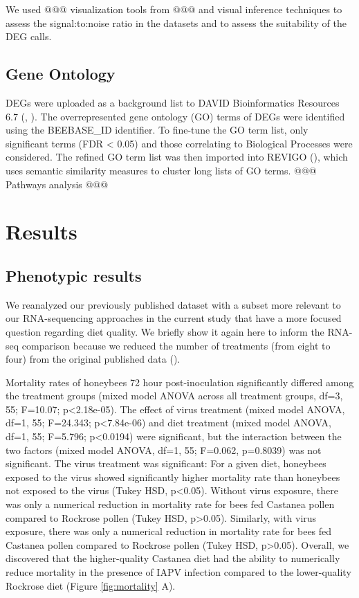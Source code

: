 \documentclass[11pt,a4paper,oldfontcommands,openany]{memoir}
\numberwithin{equation}{section} %
\begin{document}
We used @@@ visualization tools from @@@ and visual inference techniques to assess the signal:to:noise ratio in the datasets and to assess the suitability of the DEG calls. 

\subsection{Gene Ontology}

DEGs were uploaded as a background list to DAVID Bioinformatics Resources 6.7 (\citealt{davidBio}, \citealt{davidBio2}). The overrepresented gene ontology (GO) terms of DEGs were identified using the BEEBASE\_ID identifier. To fine-tune the GO term list, only significant terms (FDR < 0.05) and those correlating to Biological Processes were considered. The refined GO term list was then imported into REVIGO (\citealt{revigo}), which uses semantic similarity measures to cluster long lists of GO terms. @@@ Pathways analysis @@@

\section{Results}

\subsection{Phenotypic results}

We reanalyzed our previously published dataset with a subset more relevant to our RNA-sequencing approaches in the current study that have a more focused question regarding diet quality. We briefly show it again here to inform the RNA-seq comparison because we reduced the number of treatments (from eight to four) from the original published data (\citealt{adamInt}).

Mortality rates of honeybees 72 hour post-inoculation significantly differed among the treatment groups (mixed model ANOVA across all treatment groups, df=3, 55; F=10.07; p<2.18e-05). The effect of virus treatment (mixed model ANOVA, df=1, 55; F=24.343; p<7.84e-06) and diet treatment (mixed model ANOVA, df=1, 55; F=5.796; p<0.0194) were significant, but the interaction between the two factors (mixed model ANOVA, df=1, 55; F=0.062, p=0.8039) was not significant. The virus treatment was significant: For a given diet, honeybees exposed to the virus showed significantly higher mortality rate than honeybees not exposed to the virus (Tukey HSD, p<0.05). Without virus exposure, there was only a numerical reduction in mortality rate for bees fed Castanea pollen compared to Rockrose pollen (Tukey HSD, p>0.05). Similarly, with virus exposure, there was only a numerical reduction in mortality rate for bees fed Castanea pollen compared to Rockrose pollen (Tukey HSD, p>0.05). Overall, we discovered that the higher-quality Castanea diet had the ability to numerically reduce mortality in the presence of IAPV infection compared to the lower-quality Rockrose diet (Figure \ref{fig:mortality} A).
\end{document}
